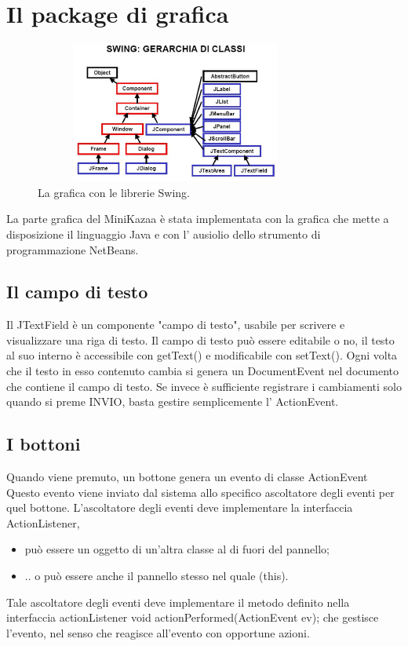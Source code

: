 \chapter{Il package di grafica}\label{chap:gui_package}
\begin{figure}[t]
 \centering
 \includegraphics[width=350px,height=175px,bb=14 14 518 368]{images/swing_diagram.eps}
 \caption{La grafica con le librerie Swing.}
 \label{fig:swing_diagram}
\end{figure}

La parte grafica del MiniKazaa è stata implementata con la grafica che mette a disposizione il linguaggio Java e con l' ausiolio dello strumento di programmazione NetBeans.

\section{Il campo di testo}
Il JTextField è un componente "campo di testo", usabile per scrivere e visualizzare una riga di testo.
Il campo di testo può essere editabile o no, il testo al suo interno è accessibile con getText() e modificabile con setText().
Ogni volta che il testo in esso contenuto cambia si genera un DocumentEvent nel documento che contiene il campo di testo.
Se invece è sufficiente registrare i cambiamenti solo quando si
preme INVIO, basta gestire semplicemente l' ActionEvent.

\section{I bottoni}
Quando viene premuto, un bottone genera un evento di classe ActionEvent
Questo evento viene inviato dal sistema allo specifico ascoltatore degli eventi per quel bottone.
L'ascoltatore degli eventi deve implementare la interfaccia ActionListener,
\begin{itemize}
\item può essere un oggetto di un'altra classe al di fuori del
pannello;
\item .. o può essere anche il pannello stesso nel quale (this).
\end{itemize}
Tale ascoltatore degli eventi deve implementare il metodo definito nella interfaccia actionListener void actionPerformed(ActionEvent ev);
che gestisce l'evento, nel senso che reagisce all'evento con opportune azioni.

